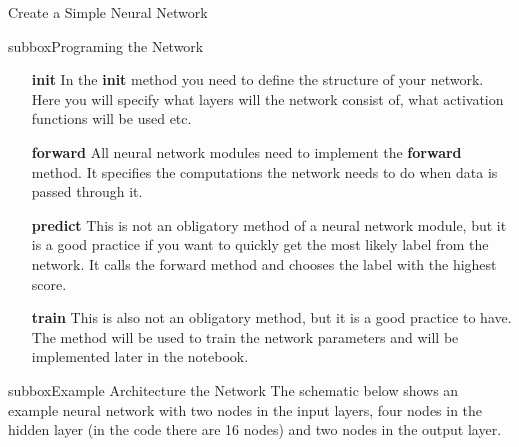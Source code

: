 \begin{multicols}{3}
\begin{textbox}{Create a Simple Neural Network}
\begin{subbox}{subbox}{Programing the Network }
\begin{itemize}
    \item[
\textbf{init}]
In the \textbf{init} method you need to define the structure of your network. Here you will specify what layers will the network consist of, what activation functions will be used etc.
\item[\textbf{forward}]
All neural network modules need to implement the \textbf{forward} method. It specifies the computations the network needs to do when data is passed through it.
\item[\textbf{predict}]
This is not an obligatory method of a neural network module, but it is a good practice if you want to quickly get the most likely label from the network. It calls the forward method and chooses the label with the highest score.
\item[\textbf{train}]
This is also not an obligatory method, but it is a good practice to have. The method will be used to train the network parameters and will be implemented later in the notebook.
\end{itemize}

\end{subbox}
\begin{subbox}{subbox}{Example Architecture the Network }
\scriptsize
The schematic below shows an example neural network with two nodes in the input layers, four nodes in the hidden layer (in the code there are 16 nodes) and two nodes in the output layer. 
\begin{center}
\end{center}
\end{subbox}
\end{textbox}
\end{multicols}
